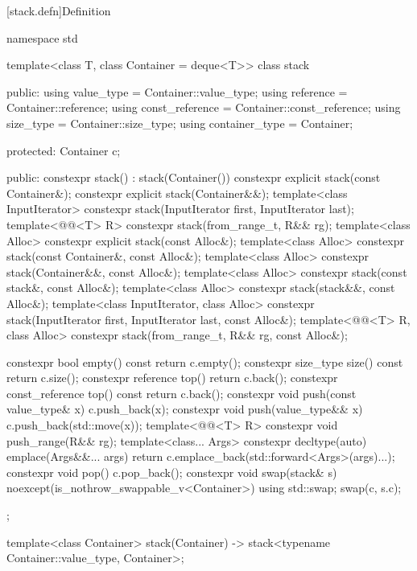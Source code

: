 [stack.defn]{Definition}

\begin{codeblock}
namespace std {
  template<class T, class Container = deque<T>>
  class stack {
  public:
    using value_type      = Container::value_type;
    using reference       = Container::reference;
    using const_reference = Container::const_reference;
    using size_type       = Container::size_type;
    using container_type  = Container;

  protected:
    Container c;

  public:
    constexpr stack() : stack(Container()) {}
    constexpr explicit stack(const Container&);
    constexpr explicit stack(Container&&);
    template<class InputIterator> constexpr stack(InputIterator first, InputIterator last);
    template<@@<T> R>
      constexpr stack(from_range_t, R&& rg);
    template<class Alloc> constexpr explicit stack(const Alloc&);
    template<class Alloc> constexpr stack(const Container&, const Alloc&);
    template<class Alloc> constexpr stack(Container&&, const Alloc&);
    template<class Alloc> constexpr stack(const stack&, const Alloc&);
    template<class Alloc> constexpr stack(stack&&, const Alloc&);
    template<class InputIterator, class Alloc>
      constexpr stack(InputIterator first, InputIterator last, const Alloc&);
    template<@@<T> R, class Alloc>
      constexpr stack(from_range_t, R&& rg, const Alloc&);

    constexpr bool              empty() const     { return c.empty(); }
    constexpr size_type         size()  const     { return c.size(); }
    constexpr reference         top()             { return c.back(); }
    constexpr const_reference   top()   const     { return c.back(); }
    constexpr void push(const value_type& x)      { c.push_back(x); }
    constexpr void push(value_type&& x)           { c.push_back(std::move(x)); }
    template<@@<T> R>
      constexpr void push_range(R&& rg);
    template<class... Args>
      constexpr decltype(auto) emplace(Args&&... args)
        { return c.emplace_back(std::forward<Args>(args)...); }
    constexpr void pop()                          { c.pop_back(); }
    constexpr void swap(stack& s) noexcept(is_nothrow_swappable_v<Container>)
      { using std::swap; swap(c, s.c); }
  };

  template<class Container>
    stack(Container) -> stack<typename Container::value_type, Container>;

}
\end{codeblock}
